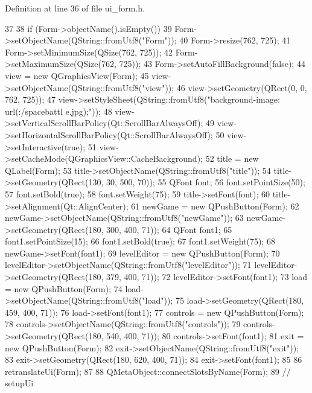 Definition at line 36 of file ui\_\-form.h.


\begin{DoxyCode}
37     {
38         if (Form->objectName().isEmpty())
39             Form->setObjectName(QString::fromUtf8("Form"));
40         Form->resize(762, 725);
41         Form->setMinimumSize(QSize(762, 725));
42         Form->setMaximumSize(QSize(762, 725));
43         Form->setAutoFillBackground(false);
44         view = new QGraphicsView(Form);
45         view->setObjectName(QString::fromUtf8("view"));
46         view->setGeometry(QRect(0, 0, 762, 725));
47         view->setStyleSheet(QString::fromUtf8("background-image: url(:/spacebattl
      e.jpg);"));
48         view->setVerticalScrollBarPolicy(Qt::ScrollBarAlwaysOff);
49         view->setHorizontalScrollBarPolicy(Qt::ScrollBarAlwaysOff);
50         view->setInteractive(true);
51         view->setCacheMode(QGraphicsView::CacheBackground);
52         title = new QLabel(Form);
53         title->setObjectName(QString::fromUtf8("title"));
54         title->setGeometry(QRect(130, 30, 500, 70));
55         QFont font;
56         font.setPointSize(50);
57         font.setBold(true);
58         font.setWeight(75);
59         title->setFont(font);
60         title->setAlignment(Qt::AlignCenter);
61         newGame = new QPushButton(Form);
62         newGame->setObjectName(QString::fromUtf8("newGame"));
63         newGame->setGeometry(QRect(180, 300, 400, 71));
64         QFont font1;
65         font1.setPointSize(15);
66         font1.setBold(true);
67         font1.setWeight(75);
68         newGame->setFont(font1);
69         levelEditor = new QPushButton(Form);
70         levelEditor->setObjectName(QString::fromUtf8("levelEditor"));
71         levelEditor->setGeometry(QRect(180, 379, 400, 71));
72         levelEditor->setFont(font1);
73         load = new QPushButton(Form);
74         load->setObjectName(QString::fromUtf8("load"));
75         load->setGeometry(QRect(180, 459, 400, 71));
76         load->setFont(font1);
77         controls = new QPushButton(Form);
78         controls->setObjectName(QString::fromUtf8("controls"));
79         controls->setGeometry(QRect(180, 540, 400, 71));
80         controls->setFont(font1);
81         exit = new QPushButton(Form);
82         exit->setObjectName(QString::fromUtf8("exit"));
83         exit->setGeometry(QRect(180, 620, 400, 71));
84         exit->setFont(font1);
85 
86         retranslateUi(Form);
87 
88         QMetaObject::connectSlotsByName(Form);
89     } // setupUi
\end{DoxyCode}


